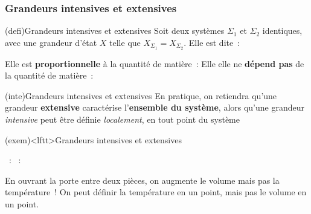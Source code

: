 \documentclass[../../main/main.tex]{subfiles}
\begin{document}
\subsubsection{Grandeurs intensives et extensives}
\begin{tcb*}(defi){Grandeurs intensives et extensives}
	Soit deux systèmes $\Sigma_1$ et $\Sigma_2$ identiques, avec une grandeur
	d'état $X$ telle que $X_{\Sigma_1} = X_{\Sigma_2}$. Elle est
	dite~:
	\smallbreak
	\begin{isd}
		Elle est \textbf{proportionnelle} à la quantité de
		matière~:
		\psw{%
			\[
				X_{\Sigma_1 + \Sigma_2} = X_{\Sigma_1} + X_{\Sigma_2} = 2 X_{\Sigma_1}
			\]
		}%
		\vspace{-15pt}
		\tcblower
		Elle elle ne \textbf{dépend pas} de la quantité de
		matière~:
		\psw{%
			\[
				X_{\Sigma_1 + \Sigma_2} = X_{\Sigma_1} = X_{\Sigma_2}
			\]
		}%
		\vspace{-15pt}
	\end{isd}
\end{tcb*}

\begin{tcb}(inte){Grandeurs intensives et extensives}
	En pratique, on retiendra qu'une grandeur \textbf{extensive} caractérise
	l'\textbf{ensemble du système}, alors qu'une grandeur \textit{intensive} peut
	être définie \textit{localement}, en tout point du système
\end{tcb}

\begin{tcb}(exem)<lftt>{Grandeurs intensives et extensives}
	\begin{itemize}
		~: 
		~: 
	\end{itemize}
	En ouvrant la porte entre deux pièces, on augmente le volume mais pas la
	température~! On peut définir la température en un point, mais pas le volume
	en un point.
\end{tcb}
\end{document}
